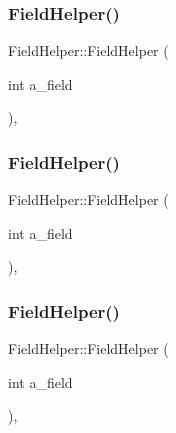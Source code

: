 \subsubsection{\texorpdfstring{FieldHelper()}{FieldHelper()}\hspace{0.1cm}{\footnotesize\ttfamily [1/3]}}
{\footnotesize\ttfamily Field\+Helper\+::\+Field\+Helper (\begin{DoxyParamCaption}\item[{int}]{a\+\_\+field }\end{DoxyParamCaption})\hspace{0.3cm}{\ttfamily [inline]}, {\ttfamily [explicit]}}

\mbox{\label{class_field_helper_a06729cbd5da2993e8007cb62f1d00b3a}} 
\subsubsection{\texorpdfstring{FieldHelper()}{FieldHelper()}\hspace{0.1cm}{\footnotesize\ttfamily [2/3]}}
{\footnotesize\ttfamily Field\+Helper\+::\+Field\+Helper (\begin{DoxyParamCaption}\item[{int}]{a\+\_\+field }\end{DoxyParamCaption})\hspace{0.3cm}{\ttfamily [inline]}, {\ttfamily [explicit]}}

\mbox{\label{class_field_helper_a06729cbd5da2993e8007cb62f1d00b3a}} 
\subsubsection{\texorpdfstring{FieldHelper()}{FieldHelper()}\hspace{0.1cm}{\footnotesize\ttfamily [3/3]}}
{\footnotesize\ttfamily Field\+Helper\+::\+Field\+Helper (\begin{DoxyParamCaption}\item[{int}]{a\+\_\+field }\end{DoxyParamCaption})\hspace{0.3cm}{\ttfamily [inline]}, {\ttfamily [explicit]}}



